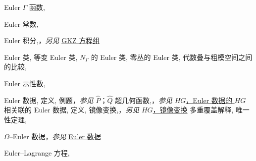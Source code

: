 \begin{theindex}
\indexspace
\item \leavevmode\hypertarget{source:479}{}\hypertarget{idx:0271}{Euler $\Gamma$ 函数},\enspace{}
\indexspace
\item \leavevmode\hypertarget{idx:0273}{Euler 常数},\enspace{}
\indexspace
\item \leavevmode\hypertarget{idx:0272}{Euler 积分},\enspace{}，\textit{另见} \hyperlink{idx:0449}{GKZ 方程组}
\indexspace
\item \leavevmode\hypertarget{idx:0257}{Euler 类},\enspace{}
\subitem \leavevmode\hypertarget{idx:0258}{等变 Euler 类},\enspace{}
\subsubitem \leavevmode\hypertarget{idx:0259}{$N_\Gamma$ 的 Euler 类},\enspace{}
\subitem \leavevmode\hypertarget{idx:0260}{零丛的 Euler 类},\enspace{}
\subitem \leavevmode\hypertarget{idx:0261}{代数叠与粗模空间之间的比较},\enspace{}
\indexspace
\item \leavevmode\hypertarget{idx:0256}{Euler 示性数},\enspace{}
\indexspace
\item \leavevmode\hypertarget{idx:0262}{Euler 数据},\enspace{}
\subitem \leavevmode\hypertarget{idx:0263}{定义},\enspace{}
\subitem \leavevmode\hypertarget{idx:0264}{例题}，\textit{参见} \hyperlink{idx:1043}{$\widehat P$}；\hyperlink{idx:1101}{$\widehat Q$}
\subitem \leavevmode\hypertarget{idx:0265}{超几何函数},\enspace{}，\textit{参见} \hyperlink{idx:0584}{$HG$，Euler 数据的 $HG$}
\subitem \leavevmode\hypertarget{idx:0266}{相关联的 Euler 数据},\enspace{}
\subsubitem \leavevmode\hypertarget{idx:0267}{定义},\enspace{}
\subsubitem \leavevmode\hypertarget{idx:0268}{镜像变换},\enspace{}，\textit{另见} \hyperlink{idx:0581}{$HG$，镜像变换}
\subitem \leavevmode\hypertarget{idx:0269}{多重覆盖解释},\enspace{}
\subitem \leavevmode\hypertarget{idx:0270}{唯一性定理},\enspace{}
\indexspace
\item \leavevmode\hypertarget{source:487}{}\hypertarget{idx:0966}{$\Omega$--Euler 数据}，\textit{参见} \hyperlink{idx:0262}{Euler 数据}
\indexspace
\item \leavevmode\hypertarget{idx:0274}{Euler--Lagrange 方程},\enspace{}

\end{theindex}
